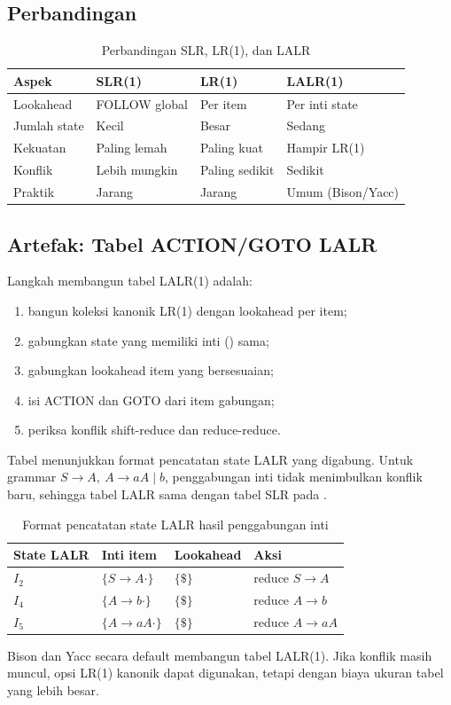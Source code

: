 \subsection{Perbandingan}

\begin{table}[H]
\centering
\caption{Perbandingan SLR, LR(1), dan LALR}
\label{tab:ch12-perbandingan}
\begin{tabularx}{\textwidth}{@{}lXXX@{}}
\toprule
\textbf{Aspek} & \textbf{SLR(1)} & \textbf{LR(1)} & \textbf{LALR(1)} \\
\midrule
Lookahead & FOLLOW global & Per item & Per inti state \\
Jumlah state & Kecil & Besar & Sedang \\
Kekuatan & Paling lemah & Paling kuat & Hampir LR(1) \\
Konflik & Lebih mungkin & Paling sedikit & Sedikit \\
Praktik & Jarang & Jarang & Umum (Bison/Yacc) \\
\bottomrule
\end{tabularx}
\end{table}

\subsection{Artefak: Tabel ACTION/GOTO LALR}

Langkah membangun tabel LALR(1) adalah:
\begin{enumerate}[label=\arabic*.,leftmargin=*]
  \item bangun koleksi kanonik LR(1) dengan lookahead per item;
  \item gabungkan state yang memiliki inti () sama;
  \item gabungkan lookahead item yang bersesuaian;
  \item isi ACTION dan GOTO dari item gabungan;
  \item periksa konflik shift-reduce dan reduce-reduce.
\end{enumerate}

Tabel  menunjukkan format pencatatan
state LALR yang digabung. Untuk grammar
\(S \to A,\ A \to aA \mid b\), penggabungan inti tidak menimbulkan
konflik baru, sehingga tabel LALR sama dengan tabel SLR pada
.

\begin{table}[H]
\centering
\caption{Format pencatatan state LALR hasil penggabungan inti}
\label{tab:ch12-artefak-lalr}
\begin{tabularx}{\textwidth}{@{}l l l X@{}}
\toprule
\textbf{State LALR} & \textbf{Inti item} & \textbf{Lookahead} &
\textbf{Aksi} \\
\midrule
\(I_2\) & \(\{S \to A \cdot\}\) & \(\{\$\}\) &
reduce \(S \to A\) \\
\(I_4\) & \(\{A \to b \cdot\}\) & \(\{\$\}\) &
reduce \(A \to b\) \\
\(I_5\) & \(\{A \to aA \cdot\}\) & \(\{\$\}\) &
reduce \(A \to aA\) \\
\bottomrule
\end{tabularx}
\end{table}

Bison dan Yacc secara default membangun tabel LALR(1). Jika konflik
masih muncul, opsi LR(1) kanonik dapat digunakan, tetapi dengan
biaya ukuran tabel yang lebih besar.
